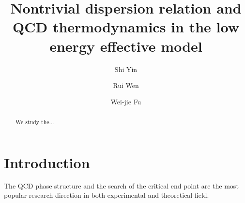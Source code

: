 \documentclass[%
reprint,
superscriptaddress,
showpacs,preprintnumbers,
 amsmath,amssymb,
 aps,
prd,
]{revtex4-1}
\begin{document}
\preprint{}

\title{Nontrivial dispersion relation and QCD thermodynamics in the low energy effective model
}

\author{Shi Yin}

\author{Rui Wen}

\author{Wei-jie Fu}


\begin{abstract}
We study the...
\end{abstract}

\maketitle



\section{Introduction}

The QCD phase structure and the search of the critical end point are the most popular research direction in both experimental and 
theoretical field. 


\end{document}
